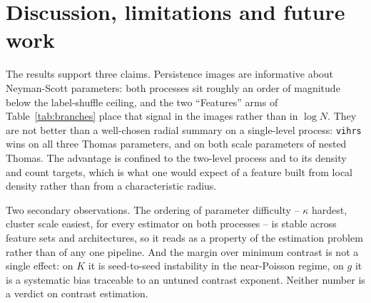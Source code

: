 \documentclass[11pt,a4paper]{article}
\theoremstyle{definitioncolon}
\begin{document}
\section{Discussion, limitations and future work}
\label{sec:future}

The results support three claims. Persistence images are informative about
Neyman-Scott parameters: both processes sit roughly an order of magnitude below
the label-shuffle ceiling, and the two ``Features'' arms of
Table~\ref{tab:branches} place that signal in the images rather than in
$\log N$. They are not better than a well-chosen radial summary on a
single-level process: \texttt{vihrs} wins on all three Thomas parameters, and on
both scale parameters of nested Thomas. The advantage is confined to the
two-level process and to its density and count targets, which is what one would
expect of a feature built from local density rather than from a characteristic
radius.

Two secondary observations. The ordering of parameter difficulty --
$\kappa$ hardest, cluster scale easiest, for every estimator on both processes
-- is stable across feature sets and architectures, so it reads as a property of
the estimation problem rather than of any one pipeline. And the margin over
minimum contrast is not a single effect: on $K$ it is seed-to-seed instability
in the near-Poisson regime, on $g$ it is a systematic bias traceable to an
untuned contrast exponent. Neither number is a verdict on contrast estimation.
\end{document}
